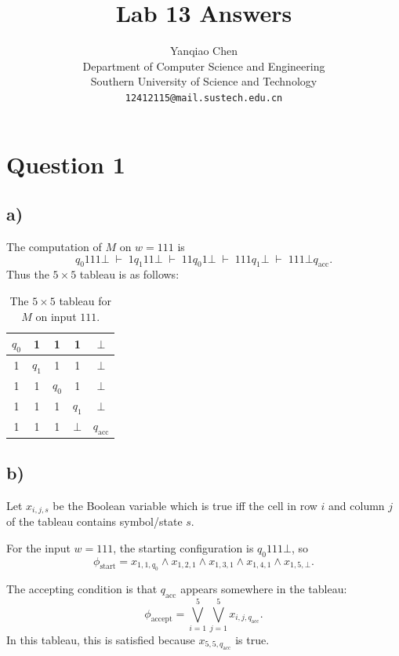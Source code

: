 \documentclass[a4paper, UTF-8]{article}
\theoremstyle{plain}
\begin{document}
\title{\bf{Lab 13 Answers}}
\author{Yanqiao Chen\\ 
  Department of Computer Science and Engineering\\
  Southern University of Science and Technology\\
  \texttt{12412115@mail.sustech.edu.cn}
  }
\maketitle

\section{Question 1} 

\subsection{a)}

The computation of $M$ on $w=111$ is
\[
q_0 111\bot \;\vdash\; 1q_1 11\bot \;\vdash\; 11q_0 1\bot
\;\vdash\; 111q_1\bot \;\vdash\; 111\bot q_{\text{acc}}.
\]
Thus the $5 \times 5$ tableau is as follows:

\begin{table}[htbp]
\centering
\begin{tabular}{|c|c|c|c|c|}
\hline
$q_0$ & 1 & 1 & 1 & $\bot$ \\
\hline
1 & $q_1$ & 1 & 1 & $\bot$ \\
\hline
1 & 1 & $q_0$ & 1 & $\bot$ \\
\hline
1 & 1 & 1 & $q_1$ & $\bot$ \\
\hline
1 & 1 & 1 & $\bot$ & $q_{\text{acc}}$ \\
\hline
\end{tabular}
\caption{The $5 \times 5$ tableau for $M$ on input $111$.}
\label{tab:5x5}
\end{table}

\subsection{b)}

Let $x_{i,j,s}$ be the Boolean variable which is true iff the cell in row $i$ and
column $j$ of the tableau contains symbol/state $s$.

For the input $w=111$, the starting configuration is $q_0 111\bot$, so
\[
\phi_{\text{start}}
= x_{1,1,q_0} \land x_{1,2,1} \land x_{1,3,1}
\land x_{1,4,1} \land x_{1,5,\bot}.
\]

The accepting condition is that $q_{\text{acc}}$ appears somewhere in the tableau:
\[
\phi_{\text{accept}}
= \bigvee_{i=1}^{5}\bigvee_{j=1}^{5} x_{i,j,q_{\text{acc}}}.
\]
In this tableau, this is satisfied because $x_{5,5,q_{\text{acc}}}$ is true.
\end{document}
